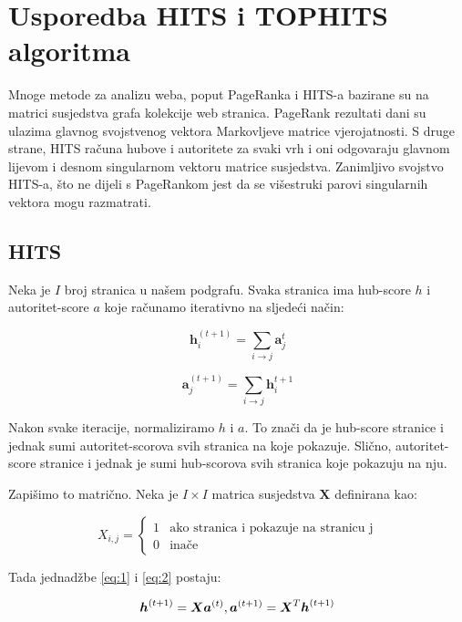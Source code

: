 \documentclass[11pt]{article}
\begin{document}
\newpage
\section{Usporedba HITS i TOPHITS algoritma}
Mnoge metode za analizu weba, poput PageRanka i HITS-a bazirane su na matrici susjedstva grafa kolekcije web stranica. PageRank rezultati dani su ulazima glavnog svojstvenog vektora Markovljeve matrice vjerojatnosti. S druge strane, HITS računa hubove i autoritete za svaki vrh i oni odgovaraju glavnom lijevom i desnom singularnom vektoru matrice susjedstva.
Zanimljivo svojstvo HITS-a, što ne dijeli s PageRankom jest da se višestruki parovi singularnih vektora mogu razmatrati.

\subsection{HITS}
\begin{flushleft}
Neka je $I$ broj stranica u našem podgrafu. Svaka stranica ima hub-score $h$ i autoritet-score $a$ koje računamo iterativno na sljedeći način:
\end{flushleft}
\begin{equation}\label{eq:1}
    \boldsymbol{h}_{i}^{(t+1)} = \displaystyle\sum_{i \rightarrow j} \boldsymbol{a}_j^{t}
\end{equation}

\begin{equation}\label{eq:2}
    \boldsymbol{a}_{j}^{(t+1)} = \displaystyle\sum_{i \rightarrow j} \boldsymbol{h}_i^{t+1}
\end{equation}

\begin{flushleft}
Nakon svake iteracije, normaliziramo $h$ i $a$. To znači da je hub-score stranice i jednak sumi autoritet-scorova svih stranica na koje pokazuje. Slično, autoritet-score stranice i jednak je sumi hub-scorova svih stranica koje pokazuju na nju.
\end{flushleft}

\begin{flushleft}
Zapišimo to matrično. Neka je $I \times I$ matrica susjedstva $\boldsymbol{X}$ definirana  kao:
\end{flushleft}
\begin{equation}
    X_{i,j} =  \left\{
	\begin{array}{ll}
		1  & \mbox{ako stranica i pokazuje na stranicu j} \\
		0 & \mbox{inače }
	\end{array}
\right.
\end{equation}
\begin{flushleft}
Tada jednadžbe \ref{eq:1} i \ref{eq:2} postaju:
\end{flushleft}
\begin{equation}
    \boldsymbol{h}^{(t+1)} = \boldsymbol{X} \boldsymbol{a}^{(t)} \\ , \\
    \boldsymbol{a}^{(t+1)} = \boldsymbol{X}^{T} \boldsymbol{h}^{(t+1)}
\end{equation}
\end{document}
